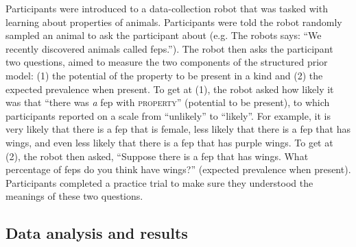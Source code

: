 \documentclass[12pt,letterpaper]{article}
\begin{document}
Participants were introduced to a data-collection robot that was tasked with learning about properties of animals. 
Participants were told the robot randomly sampled an animal to ask the participant about (e.g. The robots says: ``We recently discovered animals called feps.''). 
The robot then asks the participant two questions, aimed to measure the two components of the structured prior model: (1) the potential of the property to be present in a kind and (2) the expected prevalence when present.
To get at (1), the robot asked how likely it was that ``there was \emph{a} fep with \textsc{property}'' (potential to be present), to which participants reported on a scale from ``unlikely'' to ``likely''.
For example, it is very likely that there is a fep that is female, less likely that there is a fep that has wings, and even less likely that there is a fep that has purple wings. 
To get at (2), the robot then asked, ``Suppose there is a fep that has wings. What percentage of feps do you think have wings?'' (expected prevalence when present). 
Participants completed a practice trial to make sure they understood the meanings of these two questions.

%

\subsection*{Data analysis and results}
\end{document}
